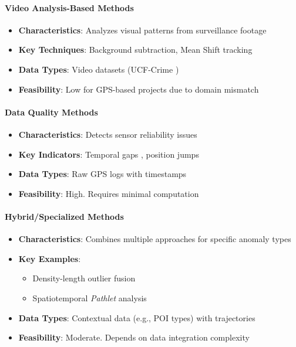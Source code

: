 \documentclass[runningheads]{llncs}
\newcommand{\term}[1]{\textit{#1}}
\begin{document}
\paragraph{Video Analysis-Based Methods}
\label{par:video-methods}

\begin{itemize}[label=•]
\item \textbf{Characteristics}: Analyzes visual patterns from surveillance footage
\item \textbf{Key Techniques}: Background subtraction, Mean Shift tracking \cite{yin2014intelligent}
\item \textbf{Data Types}: Video datasets (UCF-Crime \cite{lu2024vehicle})
\item \textbf{Feasibility}: Low for GPS-based projects due to domain mismatch
\end{itemize}

\paragraph{Data Quality Methods}
\label{par:data-quality}

\begin{itemize}[label=•]
\item \textbf{Characteristics}: Detects sensor reliability issues
\item \textbf{Key Indicators}: Temporal gaps \cite{han2016anomaly,Zheng2015TrajectoryData}, position jumps \cite{hu2024realtime,Zheng2015TrajectoryData}
\item \textbf{Data Types}: Raw GPS logs with timestamps
\item \textbf{Feasibility}: High. Requires minimal computation \cite{han2016anomaly}
\end{itemize}

\paragraph{Hybrid/Specialized Methods}
\label{par:hybrid-methods}

\begin{itemize}[label=•]
\item \textbf{Characteristics}: Combines multiple approaches for specific anomaly types
\item \textbf{Key Examples}:
  \begin{itemize}[label=--]
  \item Density-length outlier fusion \cite{hu2019based}
  \item Spatiotemporal \term{Pathlet} analysis \cite{han2016anomaly}
  \end{itemize}
\item \textbf{Data Types}: Contextual data (e.g., POI types) with trajectories
\item \textbf{Feasibility}: Moderate. Depends on data integration complexity \cite{hu2019based}
\end{itemize}
\end{document}
